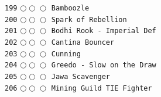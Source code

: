 \documentclass[a4paper,landscape]{article}
\begin{document}
\begin{multicols*}{5}
\texttt{199} \(\bigcirc\!\bigcirc\!\bigcirc\)  \texttt{Bamboozle} \vspace{-0.3mm}\\ 
\texttt{200} \(\bigcirc\!\bigcirc\!\bigcirc\)  \texttt{Spark of Rebellion} \vspace{-0.3mm}\\ 
\texttt{201} \(\bigcirc\!\bigcirc\!\bigcirc\)  \texttt{Bodhi Rook - Imperial Def} \vspace{-0.3mm}\\ 
\texttt{202} \(\bigcirc\!\bigcirc\!\bigcirc\)  \texttt{Cantina Bouncer} \vspace{-0.3mm}\\ 
\texttt{203} \(\bigcirc\!\bigcirc\!\bigcirc\)  \texttt{Cunning} \vspace{-0.3mm}\\ 
\texttt{204} \(\bigcirc\!\bigcirc\!\bigcirc\)  \texttt{Greedo - Slow on the Draw} \vspace{-0.3mm}\\ 
\texttt{205} \(\bigcirc\!\bigcirc\!\bigcirc\)  \texttt{Jawa Scavenger} \vspace{-0.3mm}\\ 
\texttt{206} \(\bigcirc\!\bigcirc\!\bigcirc\)  \texttt{Mining Guild TIE Fighter} \vspace{-0.3mm}\\ 

\end{multicols*}
\end{document}
